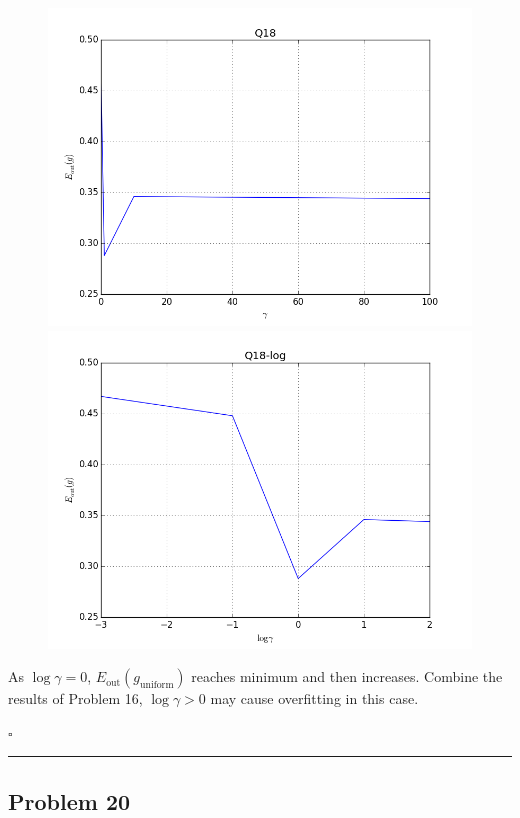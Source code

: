 \documentclass[12pt]{article}
\newcommand*{\QEDB}{\hfill\ensuremath{\square}}
\newcommand{\ParTh}[1]{\left(#1\right)}
\newcommand{\horrule}[1]{\rule{\linewidth}{#1}}
\begin{document}
\begin{figure}[H]
	\centering
	\includegraphics[scale=0.5]{Q18.png}
	\includegraphics[scale=0.5]{Q18-log.png}
\end{figure}
As $\log\gamma=0$, $E_{\text{out}}\ParTh{g_{\text{uniform}}}$ reaches minimum and then increases. Combine the results of Problem 16, $\log\gamma>0$ may cause overfitting in this case.

\QEDB

\horrule{0.5pt}

\subsection*{Problem 20}
\end{document}

